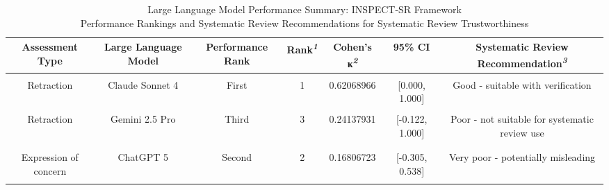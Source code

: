 \begin{table}[t]
\caption*{
{\large Large Language Model Performance Summary: INSPECT-SR Framework} \\ 
{\small Performance Rankings and Systematic Review Recommendations for Systematic Review Trustworthiness}
} 
\fontsize{13.5pt}{16.2pt}\selectfont
\begin{tabular*}{\linewidth}{@{\extracolsep{\fill}}ccccccc}
\toprule
Assessment Type & Large Language Model & Performance Rank & Rank\textsuperscript{\textit{1}} & Cohen's κ\textsuperscript{\textit{2}} & 95\% CI & Systematic Review Recommendation\textsuperscript{\textit{3}} \\ 
\midrule\addlinespace[2.5pt]
\multicolumn{7}{l}{{\bfseries \cellcolor[HTML]{2E86AB}{\textcolor[HTML]{FFFFFF}{Retraction}}}} \\[2.5pt] 
\midrule\addlinespace[2.5pt]
Retraction & Claude Sonnet 4 & First & 1 & 0.62068966 & [0.000, 1.000] & Good - suitable with verification \\ 
{\cellcolor[HTML]{F7F7F7}{Retraction}} & {\cellcolor[HTML]{F7F7F7}{ChatGPT 5}} & {\cellcolor[HTML]{F7F7F7}{Second}} & {\cellcolor[HTML]{F7F7F7}{2}} & {\cellcolor[HTML]{F7F7F7}{0.49230769}} & {\cellcolor[HTML]{F7F7F7}{[-0.078, 1.000]}} & {\cellcolor[HTML]{F7F7F7}{Fair - limited systematic review utility}} \\ 
{Retraction} & {Gemini 2.5 Pro} & {Third} & {3} & {0.24137931} & {[-0.122, 1.000]} & {Poor - not suitable for systematic review use} \\ 
\midrule\addlinespace[2.5pt]
\multicolumn{7}{l}{{\bfseries \cellcolor[HTML]{2E86AB}{\textcolor[HTML]{FFFFFF}{Expression of Concern}}}} \\[2.5pt] 
\midrule\addlinespace[2.5pt]
{\cellcolor[HTML]{F7F7F7}{Expression of concern}} & {\cellcolor[HTML]{F7F7F7}{Gemini 2.5 Pro}} & {\cellcolor[HTML]{F7F7F7}{First}} & {\cellcolor[HTML]{F7F7F7}{1}} & {\cellcolor[HTML]{F7F7F7}{0.42105263}} & {\cellcolor[HTML]{F7F7F7}{[0.108, 0.744]}} & {\cellcolor[HTML]{F7F7F7}{Fair - limited systematic review utility}} \\ 
Expression of concern & ChatGPT 5 & Second & 2 & 0.16806723 & [-0.305, 0.538] & Very poor - potentially misleading \\ 
{\cellcolor[HTML]{F7F7F7}{Expression of concern}} & {\cellcolor[HTML]{F7F7F7}{Claude Sonnet 4}} & {\cellcolor[HTML]{F7F7F7}{Third}} & {\cellcolor[HTML]{F7F7F7}{3}} & {\cellcolor[HTML]{F7F7F7}{-0.05217391}} & {\cellcolor[HTML]{F7F7F7}{[-0.388, 0.319]}} & {\cellcolor[HTML]{F7F7F7}{Very poor - potentially misleading}} \\ 

\end{tabular*}
\end{table}
